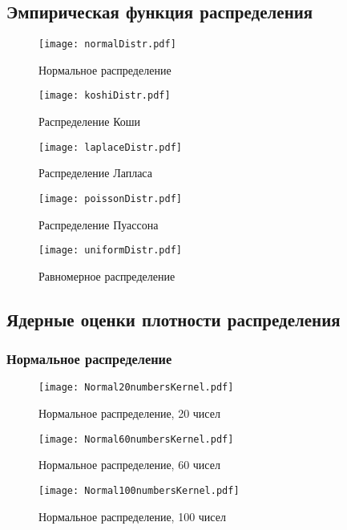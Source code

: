 \documentclass[a4paper,12pt]{article} %
\begin{document}
\subsection{Эмпирическая функция распределения}
\begin{figure}[H]
    \centering
    \texttt{[image: normalDistr.pdf]}
    \caption{Нормальное распределение}
    \label{fig:normalDis}
\end{figure}
\begin{figure}[H]
    \centering
    \texttt{[image: koshiDistr.pdf]}
    \caption{Распределение Коши}
    \label{fig:koshiDis}
\end{figure}
\begin{figure}[H]
    \centering
    \texttt{[image: laplaceDistr.pdf]}
    \caption{Распределение Лапласа}
    \label{fig:laplaceDis}
\end{figure}
\begin{figure}[H]
    \centering
    \texttt{[image: poissonDistr.pdf]}
    \caption{Распределение Пуассона}
    \label{fig:poissonDis}
\end{figure}
\begin{figure}[H]
    \centering
    \texttt{[image: uniformDistr.pdf]}
    \caption{Равномерное распределение}
    \label{fig:uniformDis}
\end{figure}
\subsection{Ядерные оценки плотности распределения}
\subsubsection{Нормальное распределение}
\begin{figure}[H]
    \centering
    \texttt{[image: Normal20numbersKernel.pdf]}
    \caption{Нормальное распределение, 20 чисел}
    \label{fig:normalKer20}
\end{figure}
\begin{figure}[H]
    \centering
    \texttt{[image: Normal60numbersKernel.pdf]}
    \caption{Нормальное распределение, 60 чисел}
    \label{fig:normalKer60}
\end{figure}
\begin{figure}[H]
    \centering
    \texttt{[image: Normal100numbersKernel.pdf]}
    \caption{Нормальное распределение, 100 чисел}
    \label{fig:normalKer100}
\end{figure}
\end{document}
